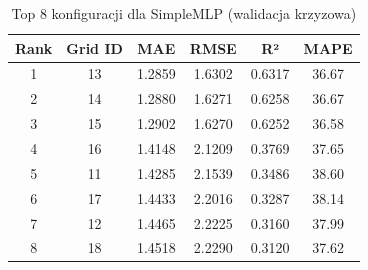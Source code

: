 \begin{table}[h]
\centering
\caption{Top 8 konfiguracji dla SimpleMLP (walidacja krzyzowa)}
\label{tab:cv_results_mlp}
\small
\begin{tabular}{cccccc}
\toprule
Rank & Grid ID & MAE & RMSE & R² & MAPE \\
\midrule
1 & 13 & 1.2859 & 1.6302 & 0.6317 & 36.67 \\
2 & 14 & 1.2880 & 1.6271 & 0.6258 & 36.67 \\
3 & 15 & 1.2902 & 1.6270 & 0.6252 & 36.58 \\
4 & 16 & 1.4148 & 2.1209 & 0.3769 & 37.65 \\
5 & 11 & 1.4285 & 2.1539 & 0.3486 & 38.60 \\
6 & 17 & 1.4433 & 2.2016 & 0.3287 & 38.14 \\
7 & 12 & 1.4465 & 2.2225 & 0.3160 & 37.99 \\
8 & 18 & 1.4518 & 2.2290 & 0.3120 & 37.62 \\
\bottomrule
\end{tabular}
\end{table}

